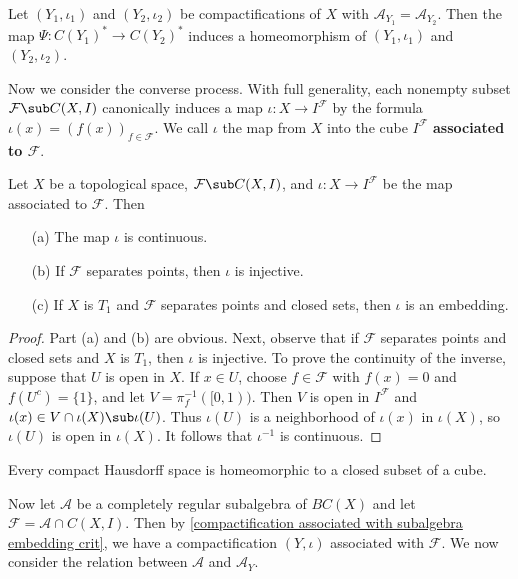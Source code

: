 \begin{corollary}\label{compactification isomorphic if same algebra}
Let $(Y_1,\iota_1)$ and $(Y_2,\iota_2)$ be compactifications of $X$ with $\mathcal{A}_{Y_1}=\mathcal{A}_{Y_2}$. Then the map $\Psi:C(Y_1)^*\to C(Y_2)^*$ induces a homeomorphism of $(Y_1,\iota_1)$ and $(Y_2,\iota_2)$.
\end{corollary}
Now we consider the converse process. With full generality, each nonempty subset $\mathcal{F}\sub C(X,I)$ canonically induces a map $\iota:X\to I^{\mathcal{F}}$ by the formula $\iota(x)=(f(x))_{f\in\mathcal{F}}$. We call $\iota$ the map from $X$ into the cube $I^\mathcal{F}$ \textbf{associated to $\mathcal{F}$}.
\begin{proposition}\label{compactification associated with subalgebra embedding crit}
Let $X$ be a topological space, $\mathcal{F}\sub C(X,I)$, and $\iota:X\to I^\mathcal{F}$ be the map associated to $\mathcal{F}$. Then
\begin{itemize}
\item[(a)] The map $\iota$ is continuous.
\item[(b)] If $\mathcal{F}$ separates points, then $\iota$ is injective.
\item[(c)] If $X$ is $T_1$ and $\mathcal{F}$ separates points and closed sets, then $\iota$ is an embedding.
\end{itemize}
\end{proposition}
\begin{proof}
Part (a) and (b) are obvious. Next, observe that if $\mathcal{F}$ separates points and closed sets and $X$ is $T_1$, then $\iota$ is injective. To prove the continuity of the inverse, suppose that $U$ is open in $X$. If $x\in U$, choose $f\in\mathcal{F}$ with $f(x)=0$ and $f(U^c)=\{1\}$, and let $V=\pi_f^{-1}([0,1))$. Then $V$ is open in $I^\mathcal{F}$ and $\iota(x)\in V\cap\iota(X)\sub\iota(U)$. Thus $\iota(U)$ is a neighborhood of $\iota(x)$ in $\iota(X)$, so $\iota(U)$ is open in $\iota(X)$. It follows that $\iota^{-1}$ is continuous.
\end{proof}
\begin{corollary}
Every compact Hausdorff space is homeomorphic to a closed subset of a cube.
\end{corollary}
Now let $\mathcal{A}$ be a completely regular subalgebra of $BC(X)$ and let $\mathcal{F}=\mathcal{A}\cap C(X,I)$. Then by \cref{compactification associated with subalgebra embedding crit}, we have a compactification $(Y,\iota)$ associated with $\mathcal{F}$. We now consider the relation between $\mathcal{A}$ and $\mathcal{A}_Y$.
